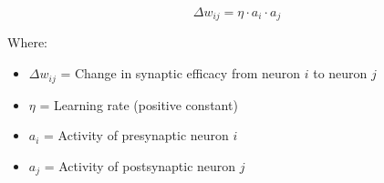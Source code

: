 % 

\begin{equation}
\boxed{\Delta w_{ij} = \eta \cdot a_i \cdot a_j}
\end{equation}

Where:
\begin{itemize}
    \item $\Delta w_{ij}$ = Change in synaptic efficacy from neuron $i$ to neuron $j$
    \item $\eta$ = Learning rate (positive constant)
    \item $a_i$ = Activity of presynaptic neuron $i$
    \item $a_j$ = Activity of postsynaptic neuron $j$
\end{itemize}
